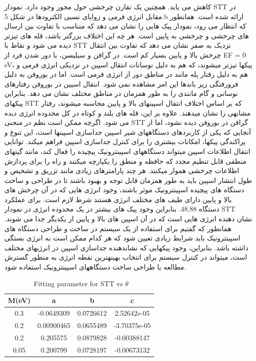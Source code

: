 کاهش می یابد. همچنین یک تقارن چرخشی حول محور وجود دارد. نمودار STT در مقابل انرژی فرمی و زوایای نسبی الکترودها در شکل 5.b ارائه شده است. همانطور که انتظار می رود، نمودار پیک هایی را نشان می دهد که متناسب با تفاوت بین ارسال های چرخشی و چرخشی به پایین است. هر چه این اختلاف بزرگتر باشد، قله های تیزتر دیده می شود و نقاط با STT نزدیک به صفر نشان می دهد که تفاوت بین انتقال چرخش بالا و پایین بسیار کم است. در گرافن و سیلیسن، با دور شدن فرد از EF = 0 eV، پیکها تیزتر میشوند، که هم به دلیل نوسانات انتقال اسپین در نزدیکی انرژی فرمی و هم به دلیل رفتار پله مانند در مناطق دور از انرژی فرمی است. اما در بوروفن به دلیل فرورفتگی زیر باندها این امر مشاهده نمی شود. انتقال اسپین در بوروفن رفتارهای نوسانی و گام مانندی را به طور همزمان در مناطق مختلف نشان می دهد. بنابراین پیکهای STT که بر اساس اختلاف انتقال اسپینهای بالا و پایین محاسبه میشوند، رفتار مشابهی را نشان میدهند. علاوه بر این، قله های بلند و کوتاه در کل محدوده انرژی دیده می شود. اگرچه ممکن است نظم در منحنی STT گرافن در بوروفن دیده نشود، اما از آنجایی که یکی از کاربردهای دستگاههای شیر اسپین جداسازی اسپینها است، این تنوع و پراکندگی پیکها، امکانات بیشتری را برای کنترل جداسازی اسپین فراهم میکند. توانایی انتقال اطلاعات اسپین میتواند دستگاههای اسپینترونیک پیچیده را فعال کند، مانند گیتهای منطقی قابل تنظیم مجدد که حافظه و منطق را یکپارچه میکنند و راه را برای پردازش اطلاعات چرخشی هموار میکنند. هر چند پارامترهای زیادی مانند تزریق و تشخیص و طول انتشار اسپین باید به طور همزمان قابل توجه و بهبود باشند تا در طراحی و ساخت دستگاه های پیچیده اسپینترونیک موثر باشند، وجود انرژی هایی که در آن چرخش های بالا و پایین دارای طیف های مختلف انرژی هستند شرط لازم است. برای عملکرد دستگاه 48,88. بنابراین وجود پیک های بیشتر در یک محدوده انرژی در نمودار STT نشان دهنده انرژی هایی است که در آن اسپین های بالا و پایین از یکدیگر جدا می شوند. همانطور که گفتیم برای استفاده از یک سیستم در ساخت و طراحی دستگاه های اسپینترونیک باید شرایط زیادی تعیین شود که هر کدام ممکن است به انرژی بستگی داشته باشد. بنابراین، وجود پیکهایی که نشاندهنده جداسازی اسپین در انرژیهای مختلف است، میتواند در کنترل سیستم برای انتخاب بهینهترین نقطه انرژی به منظور گسترش مطالعه یا طراحی ساخت دستگاههای اسپینترونیک استفاده شود.
\begin{table}[t]
    \centering
      \caption{\ Fitting parameter for STT vs $\theta$}
      \label{tbl:fitting}
      \begin{tabular}{cccc}
        \toprule
        M(eV) & a & b & c \\
        \midrule
        0.3 & -0.0649309 & 0.0726612 & 2.52642e-05 \\
        0.2 & 0.00900465 & 0.0655489 & -3.70375e-05 \\
        0.2 & 0.205575 & 0.0879828 & -0.00388147 \\
        0.05 & 0.200799 & 0.0728197 & -0.00673132 \\
        \bottomrule
      \end{tabular}
    \end{table}

